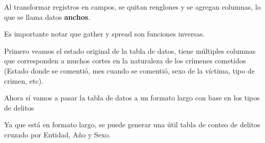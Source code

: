 \documentclass[]{book}
\newenvironment{Shaded}{\begin{snugshade}}{\end{snugshade}}
\newcommand{\KeywordTok}[1]{\textcolor[rgb]{0.13,0.29,0.53}{\textbf{#1}}}
\newcommand{\DataTypeTok}[1]{\textcolor[rgb]{0.13,0.29,0.53}{#1}}
\newcommand{\StringTok}[1]{\textcolor[rgb]{0.31,0.60,0.02}{#1}}
\newcommand{\CommentTok}[1]{\textcolor[rgb]{0.56,0.35,0.01}{\textit{#1}}}
\newcommand{\OperatorTok}[1]{\textcolor[rgb]{0.81,0.36,0.00}{\textbf{#1}}}
\newcommand{\NormalTok}[1]{#1}
\theoremstyle{definition}
\theoremstyle{definition}
\theoremstyle{definition}
\theoremstyle{remark}
\begin{document}
Al transformar registros en campos, se quitan renglones y se agregan
columnas, lo que se llama datos \textbf{anchos}.

Es importante notar que gather y spread son funciones inversas.

Primero veamos el estado original de la tabla de datos, tiene múltiples
columnas que corresponden a muchos cortes en la naturaleza de los
crímenes cometidos (Estado donde se comentió, mes cuando se comentió,
sexo de la víctima, tipo de crimen, etc).

\begin{Shaded}
\end{Shaded}

Ahora sí vamos a pasar la tabla de datos a un formato largo con base en
los tipos de delitos

\begin{Shaded}
\end{Shaded}

Ya que está en formato largo, se puede generar una útil tabla de conteo
de delitos cruzado por Entidad, Año y Sexo.
\end{document}
